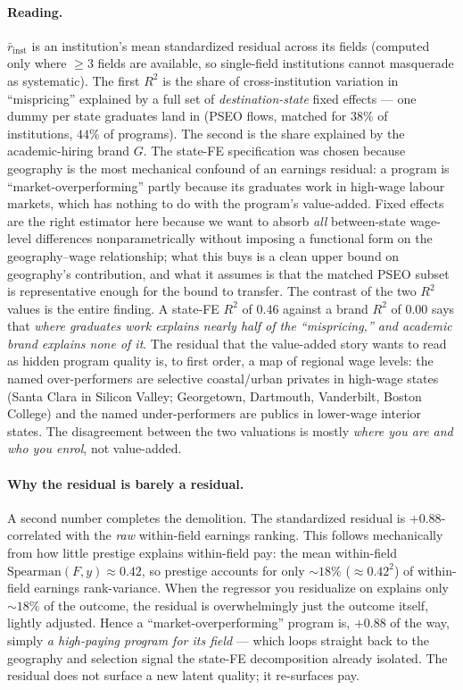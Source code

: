 \documentclass[11pt]{article}
\begin{document}
\paragraph{Reading.} $\bar r_{\text{inst}}$ is an institution's mean standardized residual across its fields (computed only where $\ge 3$ fields are available, so single-field institutions cannot masquerade as systematic). The first $R^2$ is the share of cross-institution variation in ``mispricing'' explained by a full set of \emph{destination-state} fixed effects --- one dummy per state graduates land in (PSEO flows, matched for $38\%$ of institutions, $44\%$ of programs). The second is the share explained by the academic-hiring brand $G$. The state-FE specification was chosen because geography is the most mechanical confound of an earnings residual: a program is ``market-overperforming'' partly because its graduates work in high-wage labour markets, which has nothing to do with the program's value-added. Fixed effects are the right estimator here because we want to absorb \emph{all} between-state wage-level differences nonparametrically without imposing a functional form on the geography--wage relationship; what this buys is a clean upper bound on geography's contribution, and what it assumes is that the matched PSEO subset is representative enough for the bound to transfer. The contrast of the two $R^2$ values is the entire finding. A state-FE $R^2$ of $0.46$ against a brand $R^2$ of $0.00$ says that \emph{where graduates work explains nearly half of the ``mispricing,'' and academic brand explains none of it}. The residual that the value-added story wants to read as hidden program quality is, to first order, a map of regional wage levels: the named over-performers are selective coastal/urban privates in high-wage states (Santa Clara in Silicon Valley; Georgetown, Dartmouth, Vanderbilt, Boston College) and the named under-performers are publics in lower-wage interior states. The disagreement between the two valuations is mostly \emph{where you are and who you enrol}, not value-added.

\paragraph{Why the residual is barely a residual.} A second number completes the demolition. The standardized residual is $+0.88$-correlated with the \emph{raw} within-field earnings ranking. This follows mechanically from how little prestige explains within-field pay: the mean within-field $\mathrm{Spearman}(F,y)\approx 0.42$, so prestige accounts for only $\sim 18\%$ ($\approx 0.42^2$) of within-field earnings rank-variance. When the regressor you residualize on explains only $\sim 18\%$ of the outcome, the residual is overwhelmingly just the outcome itself, lightly adjusted. Hence a ``market-overperforming'' program is, $+0.88$ of the way, simply \emph{a high-paying program for its field} --- which loops straight back to the geography and selection signal the state-FE decomposition already isolated. The residual does not surface a new latent quality; it re-surfaces pay.
\end{document}
